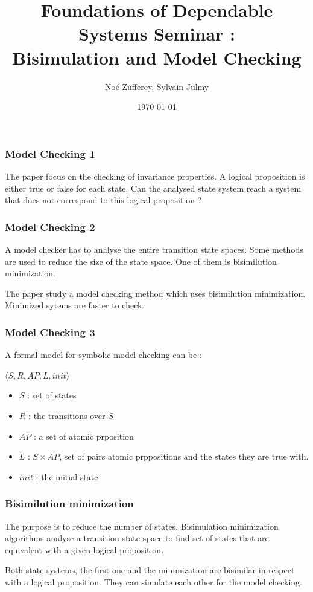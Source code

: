 \documentclass[11pt,handout]{beamer}
\title[FDS Seminar]{Foundations of Dependable Systems Seminar : \\ 
  Bisimulation and Model Checking}
\author{Noé Zufferey, Sylvain Julmy}
\date{\today}
\begin{document}
\maketitle


\begin{frame}
 \frametitle{Model Checking 1}
 The paper focus on the checking of invariance properties.
 A logical proposition is either true or false for each state.
 Can the analysed state system reach a system that does not correspond to this logical proposition ?
\end{frame}

\begin{frame}
 \frametitle{Model Checking 2} 
 A model checker has to analyse the entire transition state spaces.
 Some methods are used to reduce the size of the state space.
 One of them is bisimilution minimization.
 
 The paper study a model checking method which uses bisimilution minimization.
 Minimized sytems are faster to check.
\end{frame}

\begin{frame}
 \frametitle{Model Checking 3} 
 A formal model for symbolic model checking can be : \\ \vspace{10pt}
 
 $ \langle S, R, AP, L, init \rangle$
 \begin{itemize}
  \item $S$ : set of states
  \item $R$ : the transitions over $S$
  \item $AP$ : a set of atomic prposition
  \item $L$ : $S \times AP$, set of pairs atomic prppositions and the states they are true with.
  \item $init$ : the initial state
 \end{itemize}

\end{frame}

\begin{frame}
 \frametitle{Bisimilution minimization}
 The purpose is to reduce the number of states.
 Bisimulation minimization algorithms analyse a transition state space to find set of states
 that are equivalent with a given logical proposition.
 
 Both state systems, the first one and the minimization are bisimilar in respect with a logical proposition.
 They can simulate each other for the model checking.
\end{frame}
\end{document}
